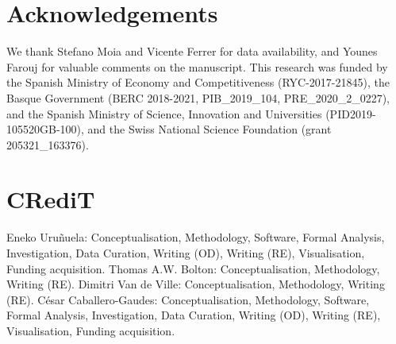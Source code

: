 \documentclass[preprint]{elsarticle}
\begin{document}
\section{Acknowledgements}
We thank Stefano Moia and Vicente Ferrer for data availability, and Younes Farouj for valuable comments on the manuscript. This research was funded by the Spanish Ministry of Economy and Competitiveness (RYC-2017-21845), the Basque Government (BERC 2018-2021, PIB\_2019\_104, PRE\_2020\_2\_0227), and the Spanish Ministry of Science, Innovation and Universities (PID2019-105520GB-100), and the Swiss National Science Foundation (grant 205321\_163376).

\section{CRediT}
Eneko Uru\~nuela: Conceptualisation, Methodology, Software, Formal Analysis, Investigation, Data Curation, Writing (OD), Writing (RE), Visualisation, Funding acquisition. Thomas A.W. Bolton: Conceptualisation, Methodology, Writing (RE). Dimitri Van de Ville: Conceptualisation, Methodology, Writing (RE). C\'{e}sar Caballero-Gaudes: Conceptualisation, Methodology, Software, Formal Analysis, Investigation, Data Curation, Writing (OD), Writing (RE), Visualisation, Funding acquisition.



\newpage

\end{document}
